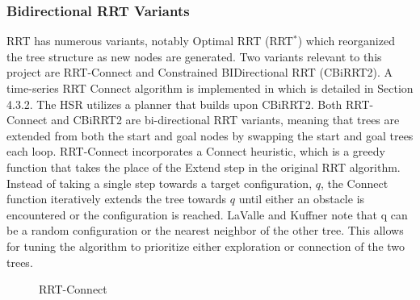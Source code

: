 \documentclass[11pt]{article}
\begin{document}
        \subsubsection{Bidirectional RRT Variants}
            RRT has numerous variants, notably Optimal RRT (RRT\(^*\)) which reorganized the tree structure as new nodes are generated. Two variants relevant to this project are RRT-Connect and Constrained BIDirectional RRT (CBiRRT2). A time-series RRT Connect algorithm is implemented in \cite{yang_planning_2018} which is detailed in Section 4.3.2. The HSR utilizes a planner that builds upon CBiRRT2. Both RRT-Connect and CBiRRT2 are bi-directional RRT variants, meaning that trees are extended from both the start and goal nodes by swapping the start and goal trees each loop. RRT-Connect incorporates a Connect heuristic, which is a greedy function that takes the place of the Extend step in the original RRT algorithm. Instead of taking a single step towards a target configuration, \(q\), the Connect function iteratively extends the tree towards \(q\) until either an obstacle is encountered or the configuration is reached. LaValle and Kuffner note that q can be a random configuration or the nearest neighbor of the other tree. This allows for tuning the algorithm to prioritize either exploration or connection of the two trees.
            \begin{figure}[ht]
                \quad
                \caption{RRT-Connect}
                \label{fig:rrt-connect}
            \end{figure}
\end{document}
